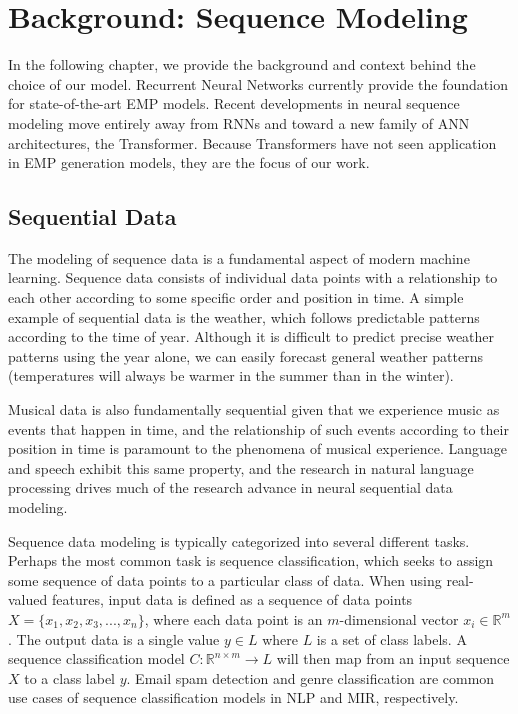 \chapter{Background: Sequence Modeling}\label{ch:ch3}
In the following chapter, we provide the background and context behind the choice of our model. Recurrent Neural Networks currently provide the foundation for state-of-the-art EMP models. Recent developments in neural sequence modeling move entirely away from RNNs and toward a new family of ANN architectures, the Transformer. Because Transformers have not seen application in EMP generation models, they are the focus of our work. 

\section{Sequential Data}\label{sec:sequential-data}
The modeling of sequence data is a fundamental aspect of modern machine learning. Sequence data consists of individual data points with a relationship to each other according to some specific order and position in time. A simple example of sequential data is the weather, which follows predictable patterns according to the time of year. Although it is difficult to predict precise weather patterns using the year alone, we can easily forecast general weather patterns (temperatures will always be warmer in the summer than in the winter). 

Musical data is also fundamentally sequential\cite{widmer2016getting} given that we experience music as events that happen in time, and the relationship of such events according to their position in time is paramount to the phenomena of musical experience. Language and speech exhibit this same property, and the research in natural language processing drives much of the research advance in neural sequential data modeling. 

Sequence data modeling is typically categorized into several different tasks. Perhaps the most common task is sequence classification, which seeks to assign some sequence of data points to a particular class of data. When using real-valued features, input data is defined as a sequence of data points $X = \{x_1, x_2, x_3, ..., x_n\}$, where each data point is an $m$-dimensional vector $x_i \in \mathbb{R}^m$. The output data is a single value $y \in L$ where $L$ is a set of class labels. A sequence classification model $C: \mathbb{R}^{n \times m} \rightarrow L$ will then map from an input sequence $X$ to a class label $y$. Email spam detection and genre classification are common use cases of sequence classification models in NLP and MIR, respectively. 

